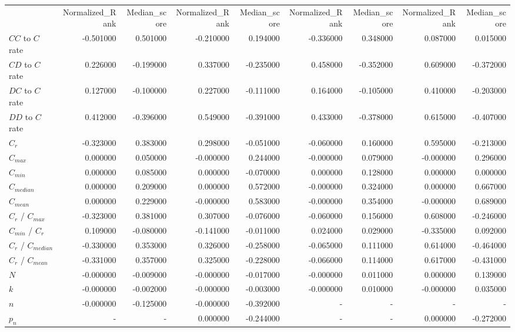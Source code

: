 \begin{tabular}{lrrrrrrrr}
 & Normalized_Rank & Median_score & Normalized_Rank & Median_score & Normalized_Rank & Median_score & Normalized_Rank & Median_score \\
$CC$ to $C$ rate & -0.501000 & 0.501000 & -0.210000 & 0.194000 & -0.336000 & 0.348000 & 0.087000 & 0.015000 \\
$CD$ to $C$ rate & 0.226000 & -0.199000 & 0.337000 & -0.235000 & 0.458000 & -0.352000 & 0.609000 & -0.372000 \\
$DC$ to $C$ rate & 0.127000 & -0.100000 & 0.227000 & -0.111000 & 0.164000 & -0.105000 & 0.410000 & -0.203000 \\
$DD$ to $C$ rate & 0.412000 & -0.396000 & 0.549000 & -0.391000 & 0.433000 & -0.378000 & 0.615000 & -0.407000 \\
$C_r$ & -0.323000 & 0.383000 & 0.298000 & -0.051000 & -0.060000 & 0.160000 & 0.595000 & -0.213000 \\
$C_{max}$ & 0.000000 & 0.050000 & -0.000000 & 0.244000 & -0.000000 & 0.079000 & -0.000000 & 0.296000 \\
$C_{min}$ & 0.000000 & 0.085000 & 0.000000 & -0.070000 & 0.000000 & 0.128000 & 0.000000 & 0.000000 \\
$C_{median}$ & 0.000000 & 0.209000 & 0.000000 & 0.572000 & -0.000000 & 0.324000 & 0.000000 & 0.667000 \\
$C_{mean}$ & 0.000000 & 0.229000 & -0.000000 & 0.583000 & -0.000000 & 0.354000 & -0.000000 & 0.689000 \\
$C_r$ / $C_{max}$  & -0.323000 & 0.381000 & 0.307000 & -0.076000 & -0.060000 & 0.156000 & 0.608000 & -0.246000 \\
$C_{min}$ / $C_r$ & 0.109000 & -0.080000 & -0.141000 & -0.011000 & 0.024000 & 0.029000 & -0.335000 & 0.092000 \\
$C_r$ / $C_{median}$ & -0.330000 & 0.353000 & 0.326000 & -0.258000 & -0.065000 & 0.111000 & 0.614000 & -0.464000 \\
$C_r$ / $C_{mean}$ & -0.331000 & 0.357000 & 0.325000 & -0.228000 & -0.066000 & 0.114000 & 0.617000 & -0.431000 \\
$N$ & -0.000000 & -0.009000 & -0.000000 & -0.017000 & -0.000000 & 0.011000 & 0.000000 & 0.139000 \\
$k$ & -0.000000 & -0.002000 & -0.000000 & -0.003000 & -0.000000 & 0.010000 & -0.000000 & 0.035000 \\
$n$ & -0.000000 & -0.125000 & -0.000000 & -0.392000 & - & - & - & - \\
$p_n$ & - & - & 0.000000 & -0.244000 & - & - & 0.000000 & -0.272000 \\

\end{tabular}
